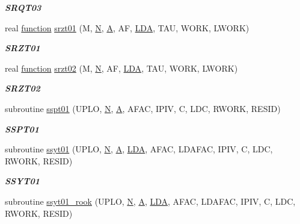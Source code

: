 \begin{DoxyCompactItemize}
\begin{DoxyCompactList}\small\item\em {\bfseries S\+R\+Q\+T03} \end{DoxyCompactList}\item 
real \hyperlink{afunc_8m_a7b5e596df91eadea6c537c0825e894a7}{function} \hyperlink{group__single__lin_ga10d08d15d92b0500d7e44c160b1f74cd}{srzt01} (M, \hyperlink{polmisc_8c_a0240ac851181b84ac374872dc5434ee4}{N}, \hyperlink{classA}{A}, A\+F, \hyperlink{example__user_8c_ae946da542ce0db94dced19b2ecefd1aa}{L\+D\+A}, T\+A\+U, W\+O\+R\+K, L\+W\+O\+R\+K)
\begin{DoxyCompactList}\small\item\em {\bfseries S\+R\+Z\+T01} \end{DoxyCompactList}\item 
real \hyperlink{afunc_8m_a7b5e596df91eadea6c537c0825e894a7}{function} \hyperlink{group__single__lin_ga0f9a98070526e636b460fba23a0ccba7}{srzt02} (M, \hyperlink{polmisc_8c_a0240ac851181b84ac374872dc5434ee4}{N}, A\+F, \hyperlink{example__user_8c_ae946da542ce0db94dced19b2ecefd1aa}{L\+D\+A}, T\+A\+U, W\+O\+R\+K, L\+W\+O\+R\+K)
\begin{DoxyCompactList}\small\item\em {\bfseries S\+R\+Z\+T02} \end{DoxyCompactList}\item 
subroutine \hyperlink{group__single__lin_ga4857ef69e2d27bab26cba2d8877ccb00}{sspt01} (U\+P\+L\+O, \hyperlink{polmisc_8c_a0240ac851181b84ac374872dc5434ee4}{N}, \hyperlink{classA}{A}, A\+F\+A\+C, I\+P\+I\+V, C, L\+D\+C, R\+W\+O\+R\+K, R\+E\+S\+I\+D)
\begin{DoxyCompactList}\small\item\em {\bfseries S\+S\+P\+T01} \end{DoxyCompactList}\item 
subroutine \hyperlink{group__single__lin_gaa07fb8780f5f48a6d6bf218e58437db8}{ssyt01} (U\+P\+L\+O, \hyperlink{polmisc_8c_a0240ac851181b84ac374872dc5434ee4}{N}, \hyperlink{classA}{A}, \hyperlink{example__user_8c_ae946da542ce0db94dced19b2ecefd1aa}{L\+D\+A}, A\+F\+A\+C, L\+D\+A\+F\+A\+C, I\+P\+I\+V, C, L\+D\+C, R\+W\+O\+R\+K, R\+E\+S\+I\+D)
\begin{DoxyCompactList}\small\item\em {\bfseries S\+S\+Y\+T01} \end{DoxyCompactList}\item 
subroutine \hyperlink{group__single__lin_gad0294a5528ecb962347a117e5e34a5e0}{ssyt01\+\_\+rook} (U\+P\+L\+O, \hyperlink{polmisc_8c_a0240ac851181b84ac374872dc5434ee4}{N}, \hyperlink{classA}{A}, \hyperlink{example__user_8c_ae946da542ce0db94dced19b2ecefd1aa}{L\+D\+A}, A\+F\+A\+C, L\+D\+A\+F\+A\+C, I\+P\+I\+V, C, L\+D\+C, R\+W\+O\+R\+K, R\+E\+S\+I\+D)

\end{DoxyCompactItemize}
